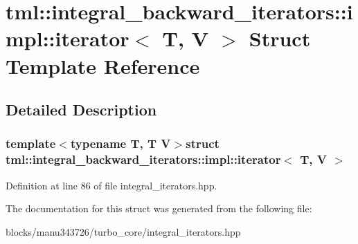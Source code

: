 \hypertarget{structtml_1_1integral__backward__iterators_1_1impl_1_1iterator}{\section{tml\+:\+:integral\+\_\+backward\+\_\+iterators\+:\+:impl\+:\+:iterator$<$ T, V $>$ Struct Template Reference}
\label{structtml_1_1integral__backward__iterators_1_1impl_1_1iterator}
}


\subsection{Detailed Description}
\subsubsection*{template$<$typename T, T V$>$struct tml\+::integral\+\_\+backward\+\_\+iterators\+::impl\+::iterator$<$ T, V $>$}



Definition at line 86 of file integral\+\_\+iterators.\+hpp.



The documentation for this struct was generated from the following file\+:\begin{DoxyCompactItemize}
\item 
blocks/manu343726/turbo\+\_\+core/integral\+\_\+iterators.\+hpp\end{DoxyCompactItemize}
